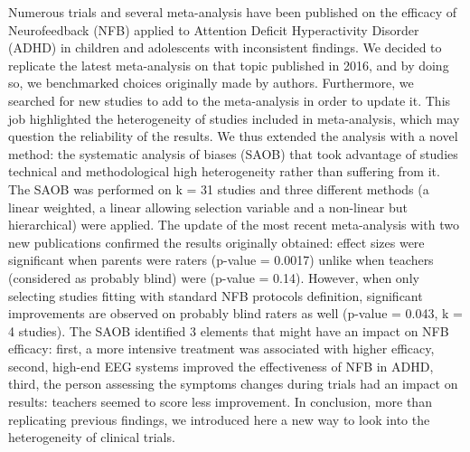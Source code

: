 



\noindent Numerous trials and several meta-analysis have been published on the efficacy of Neurofeedback (NFB) applied to Attention Deficit Hyperactivity Disorder (ADHD) 
in children and adolescents with inconsistent findings. We decided to replicate the latest meta-analysis on that topic published in 2016, 
and by doing so, we benchmarked choices originally made by authors. Furthermore, we searched for new studies to add to the meta-analysis in order to update it.
This job highlighted the heterogeneity of studies included in meta-analysis, which may question the reliability of the results. We thus extended the analysis with a novel method: 
the systematic analysis of biases (SAOB) that took advantage of studies technical and methodological high heterogeneity rather than suffering from it.
The SAOB was performed on k = 31 studies and three different methods (a linear weighted, a linear allowing selection variable and a non-linear but hierarchical) were applied.
The update of the most recent meta-analysis with two new publications confirmed the results originally obtained: effect sizes were significant when parents were 
raters (p-value = 0.0017) unlike when teachers (considered as probably blind) were (p-value = 0.14). However, when only selecting studies fitting with standard NFB protocols definition,
significant improvements are observed on probably blind raters as well (p-value = 0.043, k = 4 studies). The SAOB identified 3 elements that might have an impact on NFB efficacy: 
first, a more intensive treatment was associated with higher efficacy, second, high-end EEG systems improved the effectiveness of NFB in ADHD, third, the person assessing the symptoms changes during 
trials had an impact on results: teachers seemed to score less improvement. In conclusion, more than replicating previous findings, we introduced here a new way to look 
into the heterogeneity of clinical trials.  

